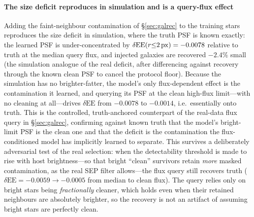 \documentclass[twocolumn]{aastex701}
\begin{document}
\paragraph{The size deficit reproduces in simulation and is a query-flux effect} Adding the
faint-neighbour contamination of \S\ref{sec:galrec} to the training stars reproduces the
size deficit in simulation, where the truth PSF is known exactly: the learned PSF is
under-concentrated by $\delta\mathrm{EE}(r{\le}2\,{\rm px})=-0.0078$ relative to truth at
the median query flux, and injected galaxies are recovered $-2.4\%$ small (the simulation
analogue of the real deficit, after differencing against recovery through the known clean
PSF to cancel the protocol floor). Because the simulation has no brighter-fatter, the
model's only flux-dependent effect is the contamination it learned, and querying its PSF at
the clean high-flux limit---with no cleaning at all---drives $\delta\mathrm{EE}$ from
$-0.0078$ to $-0.0014$, i.e.\ essentially onto truth. This is the controlled,
truth-anchored counterpart of the real-data flux query in \S\ref{sec:galrec}, confirming
against known truth that the model's bright-limit PSF is the clean one and that the deficit
is the contamination the flux-conditioned model has implicitly learned to separate. This
survives a deliberately adversarial test of the real selection: when the detectability
threshold is made to rise with host brightness---so that bright ``clean'' survivors retain
\emph{more} masked contamination, as the real SEP filter allows---the flux query still
recovers truth ($\delta\mathrm{EE}=-0.0059\to-0.0005$ from median to clean flux). The query
relies only on bright stars being \emph{fractionally} cleaner, which holds even when their
retained neighbours are absolutely brighter, so the recovery is not an artifact of assuming
bright stars are perfectly clean.
\end{document}
